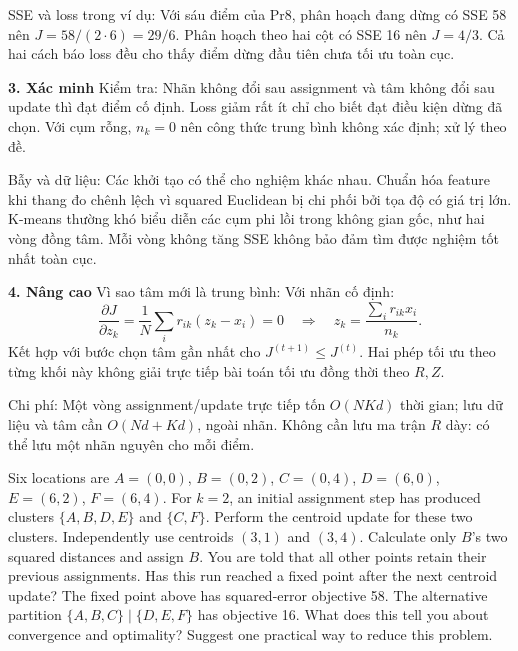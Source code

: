 \documentclass[10pt,a4paper,twocolumn]{article}
\newcommand{\key}[1]{#1:\enspace}
\newcommand{\unitheading}[2]{%
  \par\addvspace{1pt}\noindent\textbf{#1. #2}\enspace}
\newcommand{\unitverification}{\unitheading{3}{Xác minh}}
\newcommand{\unitadvanced}{\unitheading{4}{Nâng cao}}
\begin{document}
\key{SSE và loss trong ví dụ} Với sáu điểm của Pr8, phân hoạch đang dừng có SSE 58 nên $J=58/(2\cdot6)=29/6$. Phân hoạch theo hai cột có SSE 16 nên $J=4/3$. Cả hai cách báo loss đều cho thấy điểm dừng đầu tiên chưa tối ưu toàn cục.


\unitverification
\key{Kiểm tra} Nhãn không đổi sau assignment và tâm không đổi sau update thì đạt điểm cố định. Loss giảm rất ít chỉ cho biết đạt điều kiện dừng đã chọn. Với cụm rỗng, $n_k=0$ nên công thức trung bình không xác định; xử lý theo đề.

\key{Bẫy và dữ liệu} Các khởi tạo có thể cho nghiệm khác nhau. Chuẩn hóa feature khi thang đo chênh lệch vì squared Euclidean bị chi phối bởi tọa độ có giá trị lớn. K-means thường khó biểu diễn các cụm phi lồi trong không gian gốc, như hai vòng đồng tâm. Mỗi vòng không tăng SSE không bảo đảm tìm được nghiệm tốt nhất toàn cục.

\unitadvanced
\key{Vì sao tâm mới là trung bình} Với nhãn cố định:
\[
\frac{\partial J}{\partial z_k}
=\frac1N\sum_i r_{ik}(z_k-x_i)=0
\quad\Longrightarrow\quad
z_k=\frac{\sum_i r_{ik}x_i}{n_k}.
\]
Kết hợp với bước chọn tâm gần nhất cho $J^{(t+1)}\le J^{(t)}$. Hai phép tối ưu theo từng khối này không giải trực tiếp bài toán tối ưu đồng thời theo $R,Z$.

\key{Chi phí} Một vòng assignment/update trực tiếp tốn $O(NKd)$ thời gian; lưu dữ liệu và tâm cần $O(Nd+Kd)$, ngoài nhãn. Không cần lưu ma trận $R$ dày: có thể lưu một nhãn nguyên cho mỗi điểm.

Six locations are $A=(0,0)$, $B=(0,2)$, $C=(0,4)$, $D=(6,0)$, $E=(6,2)$, $F=(6,4)$. For $k=2$, an initial assignment step has produced clusters $\{A,B,D,E\}$ and $\{C,F\}$.
 Perform the centroid update for these two clusters.
 Independently use centroids $(3,1)$ and $(3,4)$. Calculate only $B$'s two squared distances and assign $B$. You are told that all other points retain their previous assignments. Has this run reached a fixed point after the next centroid update?
 The fixed point above has squared-error objective 58. The alternative partition $\{A,B,C\}\mid\{D,E,F\}$ has objective 16. What does this tell you about convergence and optimality? Suggest one practical way to reduce this problem.
\end{document}
